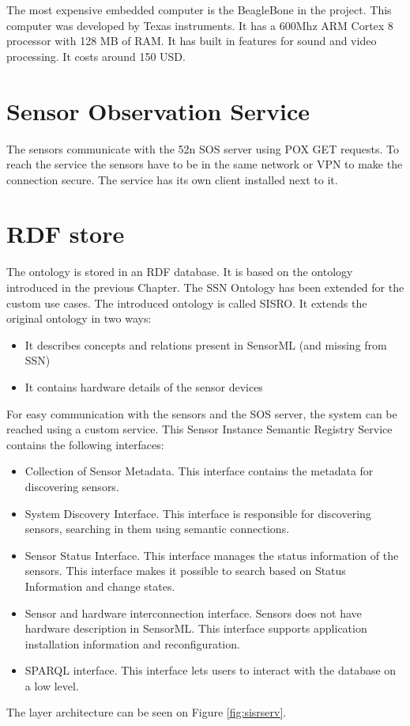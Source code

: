 The most expensive embedded computer is the BeagleBone in the project. This computer was developed by Texas instruments. It has a 600Mhz ARM Cortex 8 processor with 128 MB of RAM. It has built in features for sound and video processing. It costs around 150 USD. 


\section{Sensor Observation Service}

The sensors communicate with the 52n SOS server using POX GET requests. To reach the service the sensors have to be in the same network or VPN to make the connection secure. The service has its own client installed next to it.

\section{RDF store\label{sec:rdfstore}}

The ontology is stored in an RDF database. It is based on the ontology introduced in the previous Chapter. The SSN Ontology has been extended for the custom use cases. The introduced ontology is called SISRO. It extends the original ontology in two ways:
\begin{itemize}
	\item It describes concepts and relations present in SensorML (and missing from SSN)
	\item It contains hardware details of the sensor devices
\end{itemize}


For easy communication with the sensors and the SOS server, the system can be reached using a custom service.
This Sensor Instance Semantic Registry Service contains the following interfaces:
\begin{itemize}
	\item Collection of Sensor Metadata. This interface contains the metadata for discovering sensors.
	\item System Discovery Interface. This interface is responsible for discovering sensors, searching in them using semantic connections.
	\item Sensor Status Interface. This interface manages the status information of the sensors. This interface makes it possible to search based on Status Information and change states.
	\item Sensor and hardware interconnection interface. Sensors does not have hardware description in SensorML. This interface supports application installation information and reconfiguration.
	\item SPARQL interface. This interface lets users to interact with the database on a low level.	  
\end{itemize}
The layer architecture can be seen on Figure \ref{fig:sisrserv}.	

